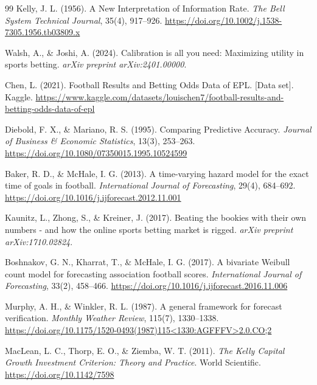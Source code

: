 \documentclass[pdflatex,sn-basic]{sn-jnl}
\begin{document}
\begin{thebibliography}{99}
Kelly, J. L. (1956).
\newblock A New Interpretation of Information Rate.
\newblock \emph{The Bell System Technical Journal}, 35(4), 917--926. \url{https://doi.org/10.1002/j.1538-7305.1956.tb03809.x}

Walsh, A., \& Joshi, A. (2024).
\newblock Calibration is all you need: Maximizing utility in sports betting.
\newblock \emph{arXiv preprint arXiv:2401.00000}.

Chen, L. (2021).
\newblock Football Results and Betting Odds Data of EPL. [Data set].
\newblock Kaggle. \url{https://www.kaggle.com/datasets/louischen7/football-results-and-betting-odds-data-of-epl}

Diebold, F. X., \& Mariano, R. S. (1995).
\newblock Comparing Predictive Accuracy.
\newblock \emph{Journal of Business \& Economic Statistics}, 13(3), 253--263. \url{https://doi.org/10.1080/07350015.1995.10524599}

Baker, R. D., \& McHale, I. G. (2013).
\newblock A time-varying hazard model for the exact time of goals in football.
\newblock \emph{International Journal of Forecasting}, 29(4), 684--692. \url{https://doi.org/10.1016/j.ijforecast.2012.11.001}

Kaunitz, L., Zhong, S., \& Kreiner, J. (2017).
\newblock Beating the bookies with their own numbers - and how the online sports betting market is rigged.
\newblock \emph{arXiv preprint arXiv:1710.02824}.

Boshnakov, G. N., Kharrat, T., \& McHale, I. G. (2017).
\newblock A bivariate Weibull count model for forecasting association football scores.
\newblock \emph{International Journal of Forecasting}, 33(2), 458--466. \url{https://doi.org/10.1016/j.ijforecast.2016.11.006}

Murphy, A. H., \& Winkler, R. L. (1987).
\newblock A general framework for forecast verification.
\newblock \emph{Monthly Weather Review}, 115(7), 1330--1338. \url{https://doi.org/10.1175/1520-0493(1987)115<1330:AGFFFV>2.0.CO;2}

MacLean, L. C., Thorp, E. O., \& Ziemba, W. T. (2011).
\newblock \emph{The Kelly Capital Growth Investment Criterion: Theory and Practice}.
\newblock World Scientific. \url{https://doi.org/10.1142/7598}


\end{thebibliography}
\end{document}
